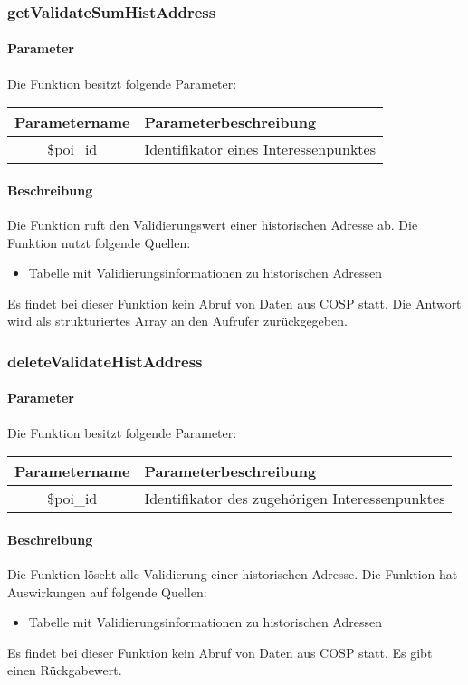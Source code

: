 \subsubsection{getValidateSumHistAddress}
\paragraph{Parameter} Die Funktion besitzt folgende Parameter:
\begin{table}[H]
	\begin{tabular}{|c|p{11cm}|}
		\hline
		\textbf{Parametername} & \textbf{Parameterbeschreibung} \\ \hline
		\$poi\_id & Identifikator eines Interessenpunktes \\ \hline
	\end{tabular}
\end{table}
\paragraph{Beschreibung} Die Funktion ruft den Validierungswert einer historischen Adresse ab. Die Funktion nutzt folgende Quellen:
\begin{itemize}
	\item Tabelle mit Validierungsinformationen zu historischen Adressen
\end{itemize}
Es findet bei dieser Funktion kein Abruf von Daten aus {\glqq COSP\grqq} statt. Die Antwort wird als strukturiertes Array an den Aufrufer zurückgegeben.
\subsubsection{deleteValidateHistAddress}
\paragraph{Parameter} Die Funktion besitzt folgende Parameter:
\begin{table}[H]
	\begin{tabular}{|c|p{11cm}|}
		\hline
		\textbf{Parametername} & \textbf{Parameterbeschreibung} \\ \hline
		\$poi\_id & Identifikator des zugehörigen Interessenpunktes \\ \hline
	\end{tabular}
\end{table}
\paragraph{Beschreibung} Die Funktion löscht alle Validierung einer historischen Adresse. Die Funktion hat Auswirkungen auf folgende Quellen:
\begin{itemize}
	\item Tabelle mit Validierungsinformationen zu historischen Adressen
\end{itemize}
Es findet bei dieser Funktion kein Abruf von Daten aus {\glqq COSP\grqq} statt. Es gibt einen Rückgabewert.
